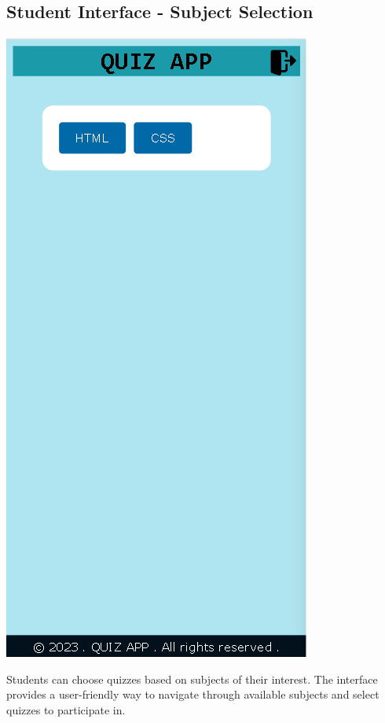 \subsection{Student Interface - Subject Selection}
\begin{center}
    \includegraphics[scale=0.4]{project/images/QUIZ PANEL.png}
\end{center}

Students can choose quizzes based on subjects of their interest. The interface provides a user-friendly way to navigate through available subjects and select quizzes to participate in.


